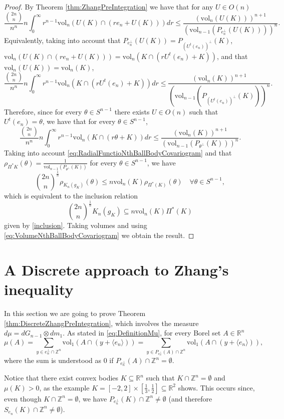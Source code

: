 \documentclass[10pt]{amsart}
\def\R{\mathbb{R}}
\def\Z{\mathbb{Z}}
\def\vol{\mathrm{vol}}
\numberwithin{equation}{section}
\begin{document}
\begin{proof}
By Theorem \ref{thm:ZhangPreIntegration} we have that for any $U\in O(n)$
$$
\frac{{{2n}\choose{n}}}{n^n}n\int_0^\infty r^{n-1}\vol_n(U(K)\cap(re_n+U(K)))dr\leq\frac{(\vol_n(U(K)))^{n+1}}{(\vol_{n-1}(P_{e_n^\perp}(U(K))))^n}.
$$
Equivalently, taking into account that $P_{e_n^\perp}(U(K))=P_{(U^t(e_n))^\perp}(K)$, \\$\vol_n(U(K)\cap(re_n+U(K)))=\vol_n(K\cap(rU^t(e_n)+K))$, and that \\$\vol_n(U(K))=\vol_n(K)$,
$$
\frac{{{2n}\choose{n}}}{n^n}n\int_0^\infty r^{n-1}\vol_n(K\cap(rU^t(e_n)+K))dr\leq\frac{(\vol_n(K))^{n+1}}{(\vol_{n-1}(P_{(U^t(e_n))^\perp}(K)))^n}.
$$
Therefore, since for every $\theta\in S^{n-1}$ there exists $U\in O(n)$ such that $U^t(e_n)=\theta$, we have that for every $\theta\in S^{n-1}$,
$$
\frac{{{2n}\choose{n}}}{n^n}n\int_0^\infty r^{n-1}\vol_n(K\cap(r\theta+K))dr\leq\frac{(\vol_n(K))^{n+1}}{(\vol_{n-1}(P_{\theta^\perp}(K)))^n}.
$$
Taking into account \eqref{eq:RadialFunctioNthBallBodyCovariogram} and that $\rho_{\Pi^*K}(\theta)=\frac{1}{\vol_{n-1}(P_{\theta^\perp}(K))}$ for every $\theta\in S^{n-1}$, we have
$$
{{2n}\choose{n}}^\frac{1}{n}\rho_{K_n(g_K)}(\theta)\leq n\vol_n(K)\rho_{\Pi^*(K)}(\theta)\quad\forall\theta\in S^{n-1},
$$
which is equivalent to the inclusion relation
$$
{{2n}\choose{n}}^\frac{1}{n}K_n(g_K)\subseteq n\vol_n(K)\Pi^*(K)
$$
given by \eqref{inclusion}. Taking volumes and using \eqref{eq:VolumeNthBallBodyCovariogram} we obtain the result.

\end{proof}


\section{A Discrete approach to Zhang's inequality}\label{sec:DiscreteZhang}

In this section we are going to prove Theorem \ref{thm:DiscreteZhangPreIntegration}, which involves the measure $d\mu=dG_{n-1}\otimes dm_1$. As stated in \eqref{eq:DefinitionMu}, for every Borel set $A\in\R^n$
$$
\mu(A)=\sum_{y\in e_n^\perp\cap \Z^n}\vol_1(A\cap(y+\langle e_n\rangle))=\sum_{y\in P_{e_n^\perp}(A)\cap\Z^n}\vol_1(A\cap(y+\langle e_n\rangle)),
$$
where the sum is understood as $0$ if $P_{e_n^\perp}(A)\cap\Z^n=\emptyset$.

Notice that there exist convex bodies $K\subseteq\R^n$ such that $K\cap\Z^n=\emptyset$ and $\mu(K)>0$, as the example $K=[-2,2]\times\left[\frac{1}{3},\frac{1}{2}\right]\subseteq\R^2$ shows. This occurs since, even though $K\cap\Z^n=\emptyset$, we have $P_{e_n^\perp}(K)\cap\Z^n\neq\emptyset$ (and therefore $S_{e_n}(K)\cap\Z^n\neq \emptyset$).
\end{document}

